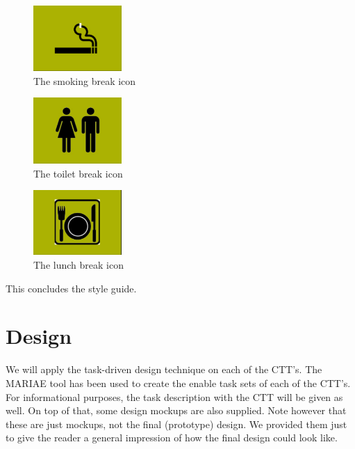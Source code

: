 \documentclass[11pt, a4paper,svglistings]{report}
\begin{document}
\begin{figure}[H]
\centering
    \includegraphics[width=0.3\textwidth]{SmokingBreak.png}
  \caption[The spinner]{The smoking break icon}
\end{figure}

\begin{figure}[H]
\centering
    \includegraphics[width=0.3\textwidth]{ToiletBreak.png}
  \caption[The spinner]{The toilet break icon}
\end{figure}

\begin{figure}[H]
\centering
    \includegraphics[width=0.3\textwidth]{LunchBreak.png}
  \caption[The spinner]{The lunch break icon}
\end{figure}

This concludes the style guide.


\chapter{Design}

We will apply the task-driven design technique on each of the CTT's. The MARIAE tool has been used to create the enable task sets of each of the CTT's. For informational purposes, the task description with the CTT will be given as well. On top of that, some design mockups are also supplied. Note however that these are just mockups, not the final (prototype) design. We provided them just to give the reader a general impression of how the final design could look like.
\end{document}

